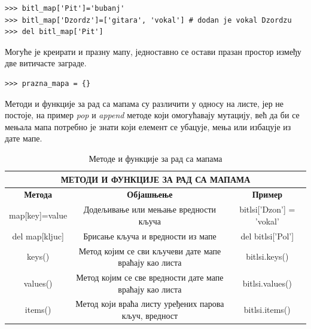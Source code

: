 \documentclass[11pt, serbianc, english, titlepage]{article}
\begin{document}
		\begin{lstlisting}[caption = Мутација мапа, label = mutacija_mapa]
>>> bitl_map['Pit']='bubanj' 
>>> bitl_map['Dzordz']=['gitara', 'vokal'] # dodan je vokal Dzordzu
>>> del bitl_map['Pit']
		\end{lstlisting}
		Могуће је креирати и празну мапу, једноставно се остави празан простор између две витичасте заграде.
		\begin{lstlisting}[caption = Креирање празне мапе, label=prazna_mapa]
>>> prazna_mapa = {}
		\end{lstlisting}
		Методи и функције за рад са мапама су различити у односу на листе, јер не постоје, на пример \emph{pop} и \emph{append} методе који омогућавају мутацију, већ да би се мењала мапа потребно је знати који елемент се убацује, мења или избацује из дате мапе.
		\begin{table}[here]
		\centering
		\begin{tabular}{|c|c|c|} \hline
		\multicolumn{3}{|c|}{\textbf{МЕТОДИ И ФУНКЦИЈЕ ЗА РАД СА МАПАМА}} \\ \hline
		\textbf{Метода} & \textbf{Објашњење} & \textbf{Пример} \\ \hline
		map[key]=value & Додељивање или мењање вредности кључа & bitlsi['Dzon'] = 'vokal' \\ \hline
		del map[kljuc] & Брисање кључа и вредности из мапе & del bitlsi['Pol'] \\ \hline
		keys() & Метод којим се сви кључеви дате мапе враћају као листа & bitlsi.keys() \\ \hline
		values() & Метод којим се све вредности дате мапе враћају као листа & bitlsi.values() \\ \hline
		items() & Метод који враћа листу уређених парова кључ, вредност & bitlsi.items() \\ \hline
		\end{tabular}
		\caption{Методе и функције за рад са мапама}
		\label{tabela:mape}
		\end{table}
\end{document}
